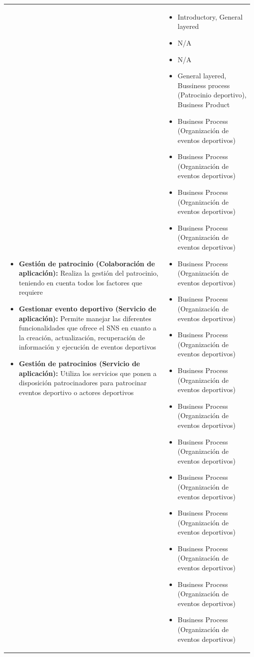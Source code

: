 \begin{table}[!htb]
\begin{center}
{\begin{tabular}{|p{7cm}|p{4cm}|}
\begin{itemize}
				\item \textbf{Gestión de patrocinio (Colaboración de aplicación):} Realiza la gestión del patrocinio, teniendo en cuenta todos los factores que requiere
				\item \textbf{Gestionar evento deportivo (Servicio de aplicación):} Permite manejar las diferentes funcionalidades que ofrece el SNS en cuanto a la creación, actualización, recuperación de información y ejecución de eventos deportivos
				\item \textbf{Gestión de patrocinios (Servicio de aplicación):} Utiliza los servicios que ponen a disposición patrocinadores para patrocinar eventos deportivo o actores deportivos
			\end{itemize} 
			&
			\begin{itemize}
				\item Introductory, General layered
				\item N/A
				\item N/A
				\item General layered, Bussiness process (Patrocinio deportivo), Business Product
				\item Business Process (Organización de eventos deportivos)
				\item Business Process (Organización de eventos deportivos) 
				\item Business Process (Organización de eventos deportivos)
				\item Business Process (Organización de eventos deportivos)
				\item Business Process (Organización de eventos deportivos) 
				\item Business Process (Organización de eventos deportivos)
				\item Business Process (Organización de eventos deportivos)
				\item Business Process (Organización de eventos deportivos) 
				\item Business Process (Organización de eventos deportivos)
				\item Business Process (Organización de eventos deportivos)
				\item Business Process (Organización de eventos deportivos) 
				\item Business Process (Organización de eventos deportivos)
				\item Business Process (Organización de eventos deportivos)
				\item Business Process (Organización de eventos deportivos)
				\item Business Process (Organización de eventos deportivos) 

\end{itemize}
\end{tabular}}
\end{center}
\end{table}
